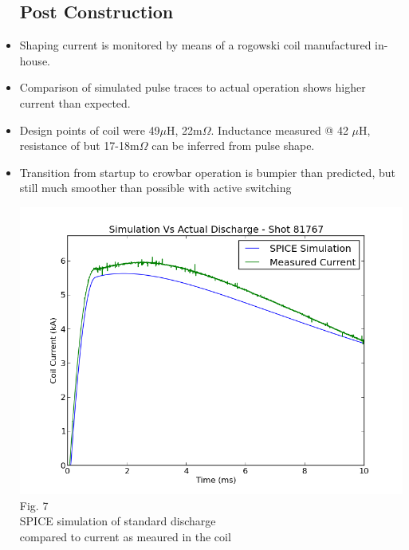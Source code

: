 \documentclass{article}
\begin{document}
\begin{multicols}{5}
\begin{itemize}
\subsection{Post Construction}
\item Shaping current is monitored by means of a rogowski coil manufactured in-house.
\item Comparison of simulated pulse traces to actual operation shows higher current than expected.
\item Design points of coil were 49$\mu$H, 22m$\Omega$. Inductance measured @ 42 $\mu$H, resistance of but 17-18m$\Omega$ can be inferred from pulse shape.
\item Transition from startup to crowbar operation is bumpier than predicted, but still much smoother than possible with active switching\\
\begin{center}
\includegraphics[width=0.75\columnwidth]{shaping_current_sim_vs_real_81797.png}\\
Fig. 7\\
SPICE simulation of standard discharge\\
compared to current as meaured in the coil\\
\end{center}

\end{itemize}
\end{multicols}
\end{document}
